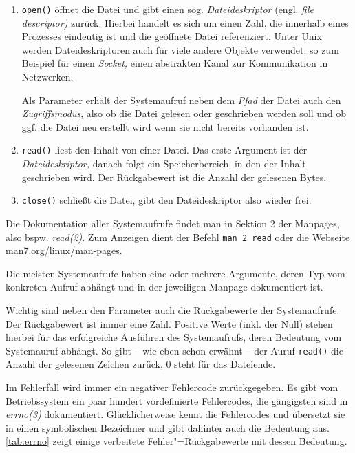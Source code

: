 \begin{enumerate}
  \item \texttt{open()} öffnet die Datei und gibt einen sog. \emph{Dateideskriptor} (engl.
   \emph{file descriptor)} zurück. Hierbei handelt es sich um einen Zahl, die innerhalb eines 
   Prozesses eindeutig ist und die geöffnete Datei referenziert. Unter Unix werden 
   Dateideskriptoren auch für viele andere Objekte verwendet, so zum Beispiel für einen
   \emph{Socket,} einen abstrakten Kanal zur Kommunikation in Netzwerken.

   Als Parameter erhält der Systemaufruf neben dem \emph{Pfad} der Datei auch den 
   \emph{Zugriffsmodus}, also ob die Datei gelesen oder geschrieben werden soll und ob ggf. die 
   Datei neu erstellt wird wenn sie nicht bereits vorhanden ist.

  \item \texttt{read()} liest den Inhalt von einer Datei. Das erste Argument ist der
   \emph{Dateideskriptor,} danach folgt ein Speicherbereich, in den der Inhalt geschrieben wird.
   Der Rückgabewert ist die Anzahl der gelesenen Bytes.

  \item \texttt{close()} schließt die Datei, gibt den Dateideskriptor also wieder frei.
\end{enumerate}

Die Dokumentation aller Systemaufrufe findet man in Sektion 2 der Manpages, also bspw.
\href{http://man7.org/linux/man-pages/man2/read.2.html}{\emph{read(2)}}. Zum Anzeigen dient der
Befehl \texttt{man 2 read} oder die Webseite 
\href{http://man7.org/linux/man-pages}{man7.org/linux/man-pages}.


Die meisten Systemaufrufe haben eine oder mehrere Argumente, deren Typ vom konkreten Aufruf abhängt
und in der jeweiligen Manpage dokumentiert ist.

Wichtig sind neben den Parameter auch die Rückgabewerte der Systemaufrufe. Der Rückgabewert ist
immer eine Zahl. Positive Werte (inkl. der Null) stehen hierbei für das erfolgreiche Ausführen
des Systemaufrufs, deren Bedeutung vom Systemauruf abhängt. So gibt -- wie eben schon erwähnt --
der Auruf \texttt{read()} die Anzahl der gelesenen Zeichen zurück, 0 steht für das Dateiende. 

Im Fehlerfall wird immer ein negativer Fehlercode zurückgegeben. Es gibt vom Betriebssystem ein 
paar hundert vordefinierte Fehlercodes, die gängigsten sind in
\href{http://man7.org/linux/man-pages/man3/errno.3.html}{\emph{errno(3)}} dokumentiert.
Glücklicherweise kennt \strace{} die Fehlercodes und übersetzt sie in einen symbolischen Bezeichner
und gibt dahinter auch die Bedeutung aus. \autoref{tab:errno} zeigt einige verbeitete
Fehler"=Rückgabewerte mit dessen Bedeutung.

